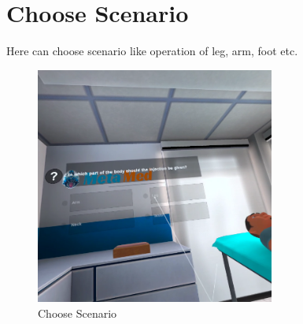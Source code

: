 \section{Choose Scenario}
Here can choose scenario like operation of leg, arm, foot etc.
\begin{figure}[h]
	\centering
	\includegraphics[width=0.7\textwidth, height=0.3\textheight]{Images/select body part.png}
	\caption{Choose Scenario}
	\label{fig:ChooseScenario}
\end{figure}